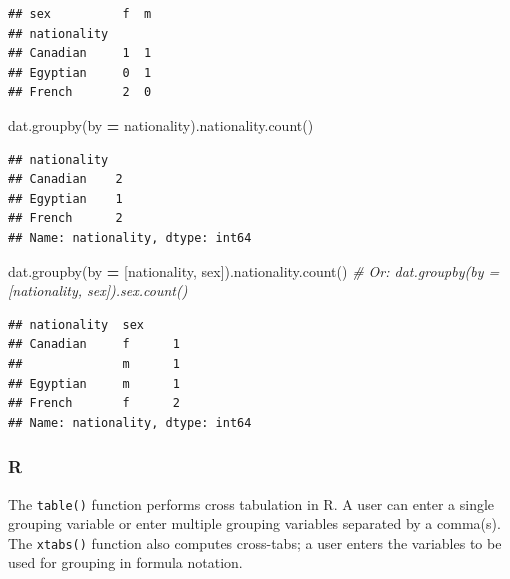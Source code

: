 \documentclass[
]{book}
\newenvironment{Shaded}{\begin{snugshade}}{\end{snugshade}}
\newcommand{\CommentTok}[1]{\textcolor[rgb]{0.56,0.35,0.01}{\textit{#1}}}
\newcommand{\FunctionTok}[1]{\textcolor[rgb]{0.00,0.00,0.00}{#1}}
\newcommand{\NormalTok}[1]{#1}
\newcommand{\OperatorTok}[1]{\textcolor[rgb]{0.81,0.36,0.00}{\textbf{#1}}}
\newcommand{\SpecialCharTok}[1]{\textcolor[rgb]{0.00,0.00,0.00}{#1}}
\newcommand{\StringTok}[1]{\textcolor[rgb]{0.31,0.60,0.02}{#1}}
\begin{document}
\begin{verbatim}
## sex          f  m
## nationality      
## Canadian     1  1
## Egyptian     0  1
## French       2  0
\end{verbatim}

\begin{Shaded}
\begin{Highlighting}[]
\NormalTok{dat.groupby(by }\OperatorTok{=} \StringTok{\textquotesingle{}nationality\textquotesingle{}}\NormalTok{).nationality.count()}
\end{Highlighting}
\end{Shaded}

\begin{verbatim}
## nationality
## Canadian    2
## Egyptian    1
## French      2
## Name: nationality, dtype: int64
\end{verbatim}

\begin{Shaded}
\begin{Highlighting}[]
\NormalTok{dat.groupby(by }\OperatorTok{=}\NormalTok{ [}\StringTok{\textquotesingle{}nationality\textquotesingle{}}\NormalTok{, }\StringTok{\textquotesingle{}sex\textquotesingle{}}\NormalTok{]).nationality.count()}
\CommentTok{\# Or: dat.groupby(by = [\textquotesingle{}nationality\textquotesingle{}, \textquotesingle{}sex\textquotesingle{}]).sex.count()}
\end{Highlighting}
\end{Shaded}

\begin{verbatim}
## nationality  sex
## Canadian     f      1
##              m      1
## Egyptian     m      1
## French       f      2
## Name: nationality, dtype: int64
\end{verbatim}

\hypertarget{r-38}{%
\subsubsection*{R}\label{r-38}}

The \texttt{table()} function performs cross tabulation in R. A user can enter a single grouping variable or enter multiple grouping variables separated by a comma(s). The \texttt{xtabs()} function also computes cross-tabs; a user enters the variables to be used for grouping in formula notation.

\begin{Shaded}
\end{Shaded}
\end{document}
